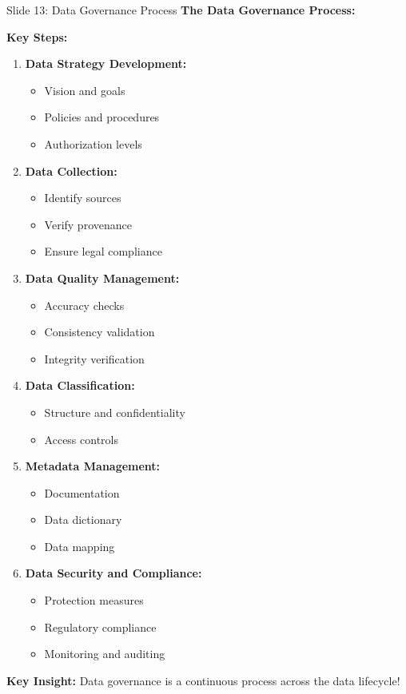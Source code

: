 \documentclass[8pt]{beamer}
\begin{document}
	\begin{frame}{Slide 13: Data Governance Process}
		\fontsize{6.5}{7.5}\selectfont
		\textbf{The Data Governance Process:}
		
		\vspace{0.1cm}
		\textbf{Key Steps:}
		\begin{enumerate}
			\item \textbf{Data Strategy Development:}
			\begin{itemize}
				\item Vision and goals
				\item Policies and procedures
				\item Authorization levels
			\end{itemize}
			\item \textbf{Data Collection:}
			\begin{itemize}
				\item Identify sources
				\item Verify provenance
				\item Ensure legal compliance
			\end{itemize}
			\item \textbf{Data Quality Management:}
			\begin{itemize}
				\item Accuracy checks
				\item Consistency validation
				\item Integrity verification
			\end{itemize}
			\item \textbf{Data Classification:}
			\begin{itemize}
				\item Structure and confidentiality
				\item Access controls
			\end{itemize}
			\item \textbf{Metadata Management:}
			\begin{itemize}
				\item Documentation
				\item Data dictionary
				\item Data mapping
			\end{itemize}
			\item \textbf{Data Security and Compliance:}
			\begin{itemize}
				\item Protection measures
				\item Regulatory compliance
				\item Monitoring and auditing
			\end{itemize}
		\end{enumerate}
		
		\textcolor{myblue}{\textbf{Key Insight:}} Data governance is a \textcolor{myblue}{continuous process across the data lifecycle}!
	\end{frame}
	
\end{document}
